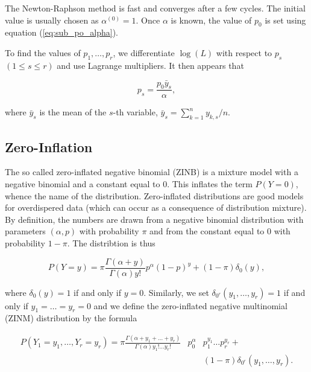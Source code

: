 \documentclass[12pt]{article}
\begin{document}
\begin{appendices}
    The Newton-Raphson method is fast and converges after a few
    cycles. The initial value is usually chosen as
    $\alpha^{(0)} = 1$.
    Once $\alpha$ is known, the value of $p_0$ is set using
    equation (\ref{eq:sub_po_alpha}).

    To find the values of $p_1, \ldots, p_r$, we differentiate
    $\log(L)$ with respect to $p_s$ $(1 \leq s \leq r)$ and use
    Lagrange multipliers. It then appears that

    \begin{equation}
      p_s = \frac{p_0 \bar{y}_s}{\alpha},
    \end{equation}

    \noindent
    where $\bar{y}_s$ is the mean of the $s$-th variable,
    $\bar{y}_s = \sum_{k=1}^n y_{k,s}/n$.

\subsection{Zero-Inflation}

    The so called zero-inflated negative binomial (ZINB) is a mixture
    model with a negative binomial and a constant equal to 0. This
    inflates the term $P(Y=0)$, whence the name of the distribution.
    Zero-inflated distributions are good models for overdispered
    data (which can occur as a consequence of distribution mixture).
    By definition, the numbers are drawn from a negative binomial
    distribution with parameters $(\alpha, p)$ with probability
    $\pi$ and from the constant equal to 0 with probability
    $1-\pi$. The distribtion is thus

    \begin{equation*}
    P(Y = y) = \pi\frac{\Gamma(\alpha+y)}{\Gamma(\alpha)y!}
    p^{\alpha}(1-p)^y + (1-\pi)\delta_0(y),
    \end{equation*}

    \noindent
    where $\delta_0(y) = 1$ if and only if $y=0$. Similarly,
    we set $\delta_{0^r}(y_1, \ldots, y_r) = 1$ if and only
    if $y_1=\ldots =y_r = 0$ and we define the zero-inflated negative
    multinomial (ZINM) distribution by the formula

    \begin{eqnarray}
      P(Y_1 = y_1, \ldots, Y_r = y_r) = \pi
       \frac{\Gamma(\alpha+y_1+\ldots+y_r)}
       {\Gamma(\alpha)y_1!\ldots y_r!}
\label{eq:zinm}
       &p_0^{\alpha}& p_1^{y_1} \ldots p_r^{y_r} + \\
       &\;& (1-\pi)\delta_{0^r}(y_1, \ldots, y_r). \nonumber
    \end{eqnarray}


\end{appendices}
\end{document}
